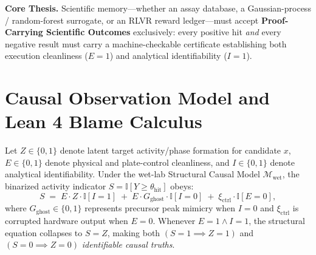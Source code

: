 \documentclass[10pt,letterpaper]{article}
\begin{document}
\textbf{Core Thesis.} Scientific memory—whether an assay database, a Gaussian-process / random-forest surrogate, or an RLVR reward ledger—must accept \textbf{Proof-Carrying Scientific Outcomes} exclusively: every positive hit \emph{and} every negative result must carry a machine-checkable certificate establishing both execution cleanliness ($E=1$) and analytical identifiability ($I=1$).

\section{Causal Observation Model and Lean 4 Blame Calculus}

Let $Z \in \{0,1\}$ denote latent target activity/phase formation for candidate $x$, $E \in \{0,1\}$ denote physical and plate-control cleanliness, and $I \in \{0,1\}$ denote analytical identifiability. Under the wet-lab Structural Causal Model $\mathcal{M}_{\mathrm{wet}}$, the binarized activity indicator $S = \mathbb{I}[Y \ge \theta_{\mathrm{hit}}]$ obeys:
\begin{equation}
  S \;=\; E \cdot Z \cdot \mathbb{I}[I = 1] \;+\; E \cdot G_{\mathrm{ghost}} \cdot \mathbb{I}[I = 0] \;+\; \xi_{\mathrm{ctrl}}\cdot\mathbb{I}[E = 0],
\end{equation}
where $G_{\mathrm{ghost}} \in \{0,1\}$ represents precursor peak mimicry when $I=0$ and $\xi_{\mathrm{ctrl}}$ is corrupted hardware output when $E=0$. Whenever $E=1 \land I=1$, the structural equation collapses to $S = Z$, making both $(S=1 \implies Z=1)$ and $(S=0 \implies Z=0)$ \emph{identifiable causal truths}.
\end{document}
